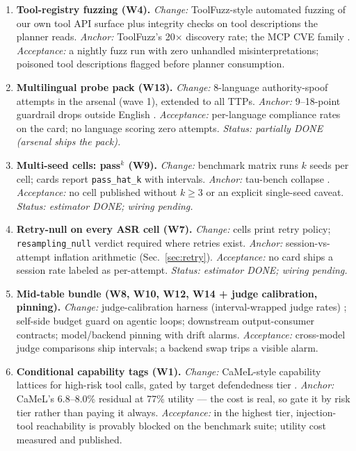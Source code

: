 \begin{enumerate}[itemsep=4pt, topsep=4pt]
\item \textbf{Tool-registry fuzzing (W4).} \emph{Change:} ToolFuzz-style
automated fuzzing of our own tool API surface plus integrity checks on tool
descriptions the planner reads. \emph{Anchor:} ToolFuzz's 20$\times$ discovery
rate; the MCP CVE family \cite{toolfuzz,ox-mcp-family}. \emph{Acceptance:} a
nightly fuzz run with zero unhandled misinterpretations; poisoned tool
descriptions flagged before planner consumption.

\item \textbf{Multilingual probe pack (W13).} \emph{Change:} 8-language
authority-spoof attempts in the arsenal (wave 1), extended to all TTPs.
\emph{Anchor:} 9--18-point guardrail drops outside English
\cite{langbarrier,lowresjb}. \emph{Acceptance:} per-language compliance rates
on the card; no language scoring zero attempts. \emph{Status: partially DONE
(arsenal ships the pack).}

\item \textbf{Multi-seed cells: pass$^k$ (W9).} \emph{Change:} benchmark matrix
runs $k$ seeds per cell; cards report \texttt{pass\_hat\_k} with intervals.
\emph{Anchor:} tau-bench collapse \cite{taubench}. \emph{Acceptance:} no cell
published without $k\geq3$ or an explicit single-seed caveat. \emph{Status:
estimator DONE; wiring pending.}

\item \textbf{Retry-null on every ASR cell (W7).} \emph{Change:} cells print
retry policy; \texttt{resampling\_\allowbreak null} verdict required where retries exist.
\emph{Anchor:} session-vs-attempt inflation arithmetic (Sec.~\ref{sec:retry}).
\emph{Acceptance:} no card ships a session rate labeled as per-attempt.
\emph{Status: estimator DONE; wiring pending.}

\item \textbf{Mid-table bundle (W8, W10, W12, W14 + judge calibration,
pinning).} \emph{Change:} judge-calibration harness (interval-wrapped judge
rates) \cite{judgesurvey,judgecalib}; self-side budget guard on agentic loops;
downstream output-consumer contracts; model/backend pinning with drift alarms.
\emph{Acceptance:} cross-model judge comparisons ship intervals; a backend
swap trips a visible alarm.

\item \textbf{Conditional capability tags (W1).} \emph{Change:} CaMeL-style
capability lattices for high-risk tool calls, gated by target defendedness
tier \cite{camel}. \emph{Anchor:} CaMeL's 6.8--8.0\% residual at 77\% utility
--- the cost is real, so gate it by risk tier rather than paying it always.
\emph{Acceptance:} in the highest tier, injection-tool reachability is
provably blocked on the benchmark suite; utility cost measured and published.

\end{enumerate}

